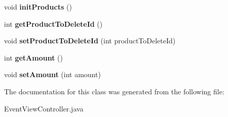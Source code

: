 \begin{DoxyCompactItemize}
void {\bfseries init\+Products} ()
\item 
\hypertarget{classch_1_1bbc_1_1partyplanner_1_1controller_1_1_event_view_controller_a3268e78ee60991510aa7e14968a9940a}{}\label{classch_1_1bbc_1_1partyplanner_1_1controller_1_1_event_view_controller_a3268e78ee60991510aa7e14968a9940a} 
int {\bfseries get\+Product\+To\+Delete\+Id} ()
\item 
\hypertarget{classch_1_1bbc_1_1partyplanner_1_1controller_1_1_event_view_controller_a3801fb584bcda970975e1be312f229cb}{}\label{classch_1_1bbc_1_1partyplanner_1_1controller_1_1_event_view_controller_a3801fb584bcda970975e1be312f229cb} 
void {\bfseries set\+Product\+To\+Delete\+Id} (int product\+To\+Delete\+Id)
\item 
\hypertarget{classch_1_1bbc_1_1partyplanner_1_1controller_1_1_event_view_controller_aa3abd7eddc3db459b868f4540e7123e5}{}\label{classch_1_1bbc_1_1partyplanner_1_1controller_1_1_event_view_controller_aa3abd7eddc3db459b868f4540e7123e5} 
int {\bfseries get\+Amount} ()
\item 
\hypertarget{classch_1_1bbc_1_1partyplanner_1_1controller_1_1_event_view_controller_a428dc4421f974d2b46a946f3ea7afdd8}{}\label{classch_1_1bbc_1_1partyplanner_1_1controller_1_1_event_view_controller_a428dc4421f974d2b46a946f3ea7afdd8} 
void {\bfseries set\+Amount} (int amount)
\end{DoxyCompactItemize}


The documentation for this class was generated from the following file\+:\begin{DoxyCompactItemize}
\item 
Event\+View\+Controller.\+java\end{DoxyCompactItemize}
